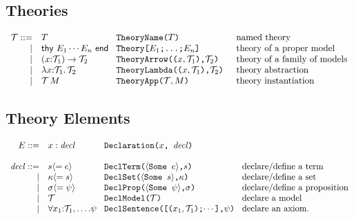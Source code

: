 \documentclass[12pt]{article}
\newcommand{\M}{M}
\newcommand{\e}{e}
\newcommand{\s}{s}
\newcommand{\X}{\x} %
\newcommand{\n}{x} %
\newcommand{\p}{\psi} %
\newcommand{\pt}{\sigma} %
\newcommand{\x}{\n} %
\renewcommand{\k}{\kappa} %
\newcommand{\T}{\ensuremath{\mathcal T}}
\renewcommand{\t}{T}
\newcommand{\elem}{E}
\begin{document}
\subsection{Theories}

\newcommand{\tTheory}[1]{\mathsf{thy}\ #1 \ \mathsf{end}}
\newcommand{\tArrow}[3]{(#1{:}#2)\to #3}
\newcommand{\tLambda}[3]{\lambda #1{:}#2.\,#3}
\newcommand{\tApp}[2]{#1\,#2}


\[
\begin{array}{rl@{\hspace{0.3cm}}l@{\hspace{0.5cm}}l}
\T ::= & \t & \texttt{TheoryName($\t$)} & \mbox{named theory}\\
 |&\tTheory{\elem_1 \cdots \elem_n} &
     \texttt{Theory[$\elem_1$;\ldots;$\elem_n$]}& \mbox{theory of a proper model}\\
|&\tArrow{\X}{\T_1}{\T_2}&\texttt{TheoryArrow(($\X,\T_1$),$\T_2$)}&\mbox{theory of a family of models}\\
|&\tLambda{\X}{\T_1}{\T_2}&\texttt{TheoryLambda(($\X,\T_1$),$\T_2$)}&\mbox{theory abstraction}\\
|&\tApp{\T}{\M}&\texttt{TheoryApp($\T,\M$)}&\mbox{theory instantiation}
\end{array}
\]

\subsection{Theory Elements}

\newcommand{\decl}{\mathit{decl}}
\[
\begin{array}{rl@{\hspace{0.3cm}}l@{\hspace{0.3cm}}l}
\elem ::= &\x : \decl& \texttt{Declaration($\x$, $\decl$)}\\[12pt]

\decl ::= &\s \langle = \e\rangle & \texttt{DeclTerm($\langle$Some $\e$$\rangle$,$\s$)} & \mbox{declare/define a term}\\
| &\k \langle = \s\rangle & \texttt{DeclSet($\langle$Some $\s$$\rangle$,$\k$)} & \mbox{declare/define a set}\\
| &\pt \langle = \p\rangle & \texttt{DeclProp($\langle$Some $\p$$\rangle$,$\pt$)} & \mbox{declare/define a proposition}\\
| &\T& \texttt{DeclModel($\T$)}&\mbox{declare a model}\\
| &\forall \X_1{:}\T_1,\ldots.\p&
    \texttt{DeclSentence([($\X_1,\T_1$);$\cdots$],$\p$)} &
    \mbox{declare an axiom}.
\end{array}
\]
\end{document}
